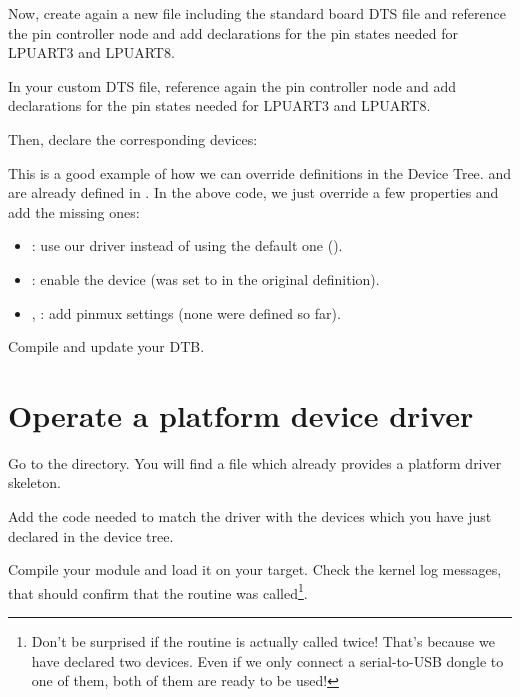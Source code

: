 Now, create again a new
 file including
the standard board DTS file and reference the pin controller node and add declarations for the pin states needed for LPUART3 and LPUART8.

{\scriptsize {}}

In your custom DTS file, reference again the pin controller node and add
declarations for the pin states needed for LPUART3 and LPUART8.

Then, declare the corresponding devices:

{\scriptsize {}}

This is a good example of how we can override definitions in the Device
Tree.  and  are already defined in
. In the above code, we
just override a few properties and add the missing ones:

\begin{itemize}
\item {}: use our driver instead of using the default one
      ().
\item {}: enable the device (was set to  in
      the original definition).
\item {}, : add pinmux settings
      (none were defined so far).
\end{itemize}

Compile and update your DTB.

\section{Operate a platform device driver}

Go to the  directory.
You will find a  file which already provides a platform
driver skeleton.

Add the code needed to match the driver with the devices which you have
just declared in the device tree.

Compile your module and load it on your target. Check the kernel log
messages, that should confirm that the  routine was
called\footnote{Don't be surprised if the  routine is
actually called twice! That's because we have declared two devices.
Even if we only connect a serial-to-USB dongle to one of them, both
of them are ready to be used!}.

